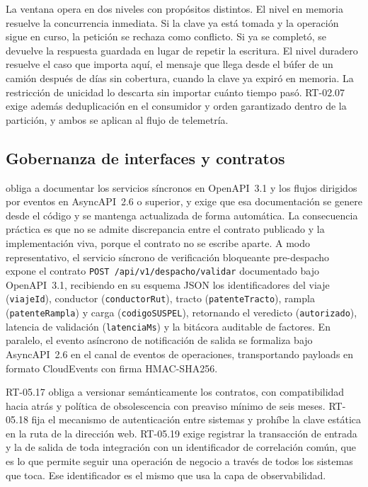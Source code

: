 La ventana opera en dos niveles con propósitos distintos. El nivel en memoria resuelve la concurrencia
inmediata. Si la clave ya está tomada y la operación sigue en curso, la petición se rechaza como
conflicto. Si ya se completó, se devuelve la respuesta guardada en lugar de repetir la escritura. El
nivel duradero resuelve el caso que importa aquí, el mensaje que llega desde el búfer de un camión
después de días sin cobertura, cuando la clave ya expiró en memoria. La restricción de unicidad lo
descarta sin importar cuánto tiempo pasó. RT-02.07 exige además deduplicación en el consumidor y orden
garantizado dentro de la partición, y ambos se aplican al flujo de telemetría.

\subsection{Gobernanza de interfaces y contratos}\label{sec:4-interfaces}

 obliga a documentar los servicios síncronos en OpenAPI~3.1 y los flujos dirigidos
por eventos en AsyncAPI~2.6 o superior, y exige que esa documentación se genere desde el código y se
mantenga actualizada de forma automática. La consecuencia práctica es que no se admite discrepancia
entre el contrato publicado y la implementación viva, porque el contrato no se escribe aparte.
A modo representativo, el servicio síncrono de verificación bloqueante pre-despacho expone el contrato
\texttt{POST /api/v1/despacho/validar} documentado bajo OpenAPI~3.1, recibiendo en su esquema JSON
los identificadores del viaje (\texttt{viajeId}), conductor (\texttt{conductorRut}), tracto
(\texttt{patenteTracto}), rampla (\texttt{patenteRampla}) y carga (\texttt{codigoSUSPEL}), retornando el
veredicto (\texttt{autorizado}), latencia de validación (\texttt{latenciaMs}) y la bitácora auditable de
factores. En paralelo, el evento asíncrono de notificación de salida se formaliza bajo AsyncAPI~2.6
en el canal de eventos de operaciones, transportando payloads en formato CloudEvents con firma HMAC-SHA256.

RT-05.17 obliga a versionar semánticamente los contratos, con compatibilidad hacia atrás y política de
obsolescencia con preaviso mínimo de seis meses. RT-05.18 fija el mecanismo de autenticación entre
sistemas y prohíbe la clave estática en la ruta de la dirección web. RT-05.19 exige registrar la
transacción de entrada y la de salida de toda integración con un identificador de correlación común,
que es lo que permite seguir una operación de negocio a través de todos los sistemas que toca. Ese
identificador es el mismo que usa la capa de observabilidad.

